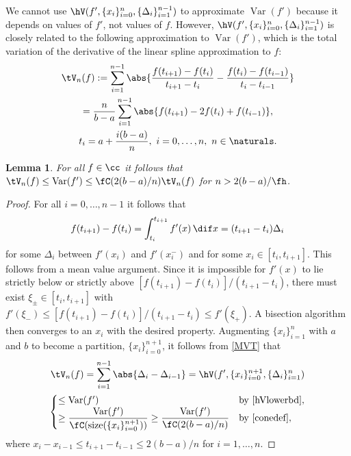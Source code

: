 \documentclass[]{article}
\DeclareMathOperator{\Var}{Var}
\DeclareMathOperator{\size}{size}
\newtheorem{lem}{Lemma}
\theoremstyle{definition}
\theoremstyle{remark}
\newcommand{\datasites}{\{x_i\}_{i=0}^n}
\newcommand{\hcut}{\fh}
\begin{document}
We cannot use $\hV(f',\datasites,\{\Delta_{i}\}_{i=1}^{n-1})$ to approximate $\Var(f')$ because it depends on values of $f'$, not values of $f$.  However, $\hV(f',\datasites,\{\Delta_{i}\}_{i=1}^{n-1})$ is closely related to the following approximation to $\Var(f')$, which is the total variation of the derivative of the linear spline approximation to $f$:
\begin{multline*}
\tV_n(f) : = \sum_{i=1}^{n-1} \abs{ \frac{f(t_{i+1})-f(t_{i})}{t_{i+1}-t_{i}} - \frac{f(t_i)-f(t_{i-1})}{t_i-t_{i-1}}} \\
= \frac{n}{b-a}\sum_{i=1}^{n-1} \abs{ f(t_{i+1})-2f(t_{i})+f(t_{i-1})}, \\
t_i= a + \frac{i(b-a)}{n},\ i=0, \ldots, n, \ n \in \naturals.
\end{multline*}
\begin{lem}  \label{tVlem}
For all $f \in \cc$ it follows that $\tV_n(f) \le \Var(f') \le \fC(2(b-a)/n) \tV_n(f)$ for $n>2(b-a)/\hcut$.
\end{lem}
\begin{proof} For all $i=0, \ldots, n-1$ it follows that 
\begin{equation} \label{MVT}
f(t_{i+1})-f(t_{i}) = \int_{t_i}^{t_{i+1}} f'(x) \, \dif x = (t_{i+1}-t_{i}) \Delta_i
\end{equation}
for some $\Delta_{i}$ between $f'(x_i)$ and $f'(x_i^-)$ and for some $x_i \in [t_{i},t_{i+1}]$.  This follows from a mean value argument. Since it is impossible for $f'(x)$ to lie strictly below or strictly above $[f(t_{i+1})-f(t_{i})]/(t_{i+1}-t_{i})$, there must exist $\xi_{\pm} \in [t_{i},t_{i+1}]$ with $f'(\xi_-) \le [f(t_{i+1})-f(t_{i})]/(t_{i+1}-t_{i}) \le f'(\xi_+)$.  A bisection algorithm then converges to an $x_i$ with the desired property.
Augmenting $\{x_{i}\}_{i=1}^n$ with $a$ and $b$ to become a partition, $\{x_i\}_{i=0}^{n+1}$, it follows from \eqref{MVT} that 
\begin{multline*}
\tV_n(f) = \sum_{i=1}^{n-1} \abs{ \Delta_i - \Delta_{i-1}} = \hV(f',\{x_i\}_{i=0}^{n+1},\{\Delta_{i}\}_{i=1}^{n}) \\
 \begin{cases} \le \Var(f') & \text{by \eqref{hVlowerbd}}, \\
\displaystyle  \ge \frac{\Var(f')}{\fC(\size(\{x_i\}_{i=0}^{n+1}))} \ge \frac{\Var(f')}{\fC(2(b-a)/n)} & \text{by \eqref{conedef}},
\end{cases}
\end{multline*}
where $x_i - x_{i-1} \le t_{i+1} - t_{i-1} \le 2(b-a)/n$ for $i=1, \ldots, n$.
\end{proof}
\end{document}
